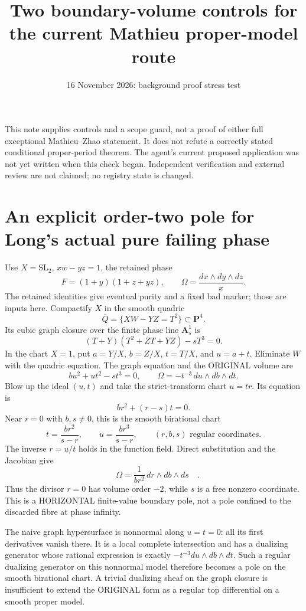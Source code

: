 \documentclass{article}
\begin{document}
\title{Two boundary-volume controls for the current Mathieu proper-model route}
\date{16 November 2026: background proof stress test}
\maketitle
This note supplies controls and a scope guard, not a proof of either full exceptional Mathieu--Zhao statement. It does not refute a correctly stated conditional proper-period theorem. The agent's current proposed application was not yet written when this check began. Independent verification and external review are not claimed; no registry state is changed.

\section{An explicit order-two pole for Long's actual pure failing phase}
Use $X=\mathrm{SL}_2$, $xw-yz=1$, the retained phase
\[
 F=(1+y)(1+z+yz),\qquad \Omega=\frac{dx\wedge dy\wedge dz}{x}.
\]
The retained identities give eventual purity and a fixed bad marker; those are inputs here. Compactify $X$ in the smooth quadric
\[
 \overline Q=\{XW-YZ=T^2\}\subset\mathbf P^4.
\]
Its cubic graph closure over the finite phase line $\mathbf A^1_s$ is
\[
 (T+Y)(T^2+ZT+YZ)-sT^3=0.
\]
In the chart $X=1$, put $a=Y/X$, $b=Z/X$, $t=T/X$, and $u=a+t$. Eliminate $W$ with the quadric equation. The graph equation and the ORIGINAL volume are
\[
 b u^2+u t^2-s t^3=0,\qquad
 \Omega=-t^{-3}\,du\wedge db\wedge dt.
\]
Blow up the ideal $(u,t)$ and take the strict-transform chart $u=tr$. Its equation is
\[
 b r^2+(r-s)t=0.
\]
Near $r=0$ with $b,s\ne0$, this is the smooth birational chart
\[
 t=\frac{b r^2}{s-r},\qquad u=\frac{b r^3}{s-r},
 \qquad (r,b,s)\text{ regular coordinates}.
\]
The inverse $r=u/t$ holds in the function field. Direct substitution and the Jacobian give
\[
 \boxed{\quad\Omega=\frac{1}{b r^2}\,dr\wedge db\wedge ds\quad}.
\]
Thus the divisor $r=0$ has volume order $-2$, while $s$ is a free nonzero coordinate. This is a HORIZONTAL finite-value boundary pole, not a pole confined to the discarded fibre at phase infinity.

The naive graph hypersurface is nonnormal along $u=t=0$: all its first derivatives vanish there. It is a local complete intersection and has a dualizing generator whose rational expression is exactly $-t^{-3}du\wedge db\wedge dt$. Such a regular dualizing generator on this nonnormal model therefore becomes a pole on the smooth birational chart. A trivial dualizing sheaf on the graph closure is insufficient to extend the ORIGINAL form as a regular top differential on a smooth proper model.
\end{document}
